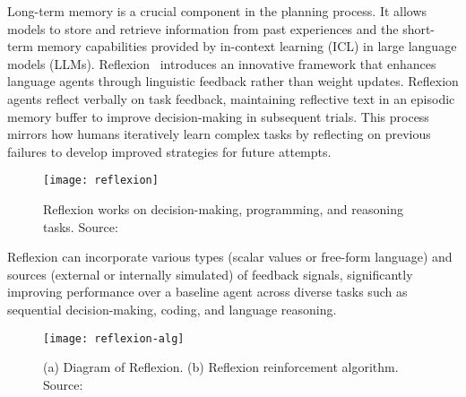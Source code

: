 Long-term memory is a crucial component in the planning process. It allows models to store and retrieve information from past experiences and the short-term memory capabilities provided by in-context learning (ICL) in large language models (LLMs).
Reflexion~\cite{shinn2023reflexion} introduces an innovative framework that enhances language agents through linguistic feedback rather than weight updates.
Reflexion agents reflect verbally on task feedback, maintaining reflective text in an episodic memory buffer to improve decision-making in subsequent trials.
This process mirrors how humans iteratively learn complex tasks by reflecting on previous failures to develop improved strategies for future attempts.

\begin{figure}[h!]
	\centering
	\texttt{[image: reflexion]}
	\caption{Reflexion works on decision-making, programming, and reasoning tasks. Source: \textcite{shinn2023reflexion}}
	\label{fig:reflexion}
\end{figure}

Reflexion can incorporate various types (scalar values or free-form language) and sources (external or internally simulated) of feedback signals, significantly improving performance over a baseline agent across diverse tasks such as sequential decision-making, coding, and language reasoning.

\begin{figure}[h!]
	\centering
	\texttt{[image: reflexion-alg]}
	\caption{(a) Diagram of Reflexion. (b) Reflexion reinforcement algorithm. Source: \textcite{shinn2023reflexion}}
	\label{fig:reflexion-alg}
\end{figure}


